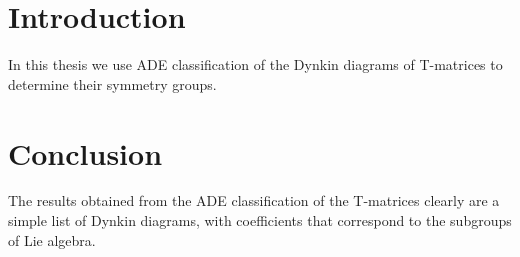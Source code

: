 \documentclass{article}
\begin{document}
\section{Introduction}

In this thesis we use ADE classification of the Dynkin diagrams of T-matrices
to determine their symmetry groups.

\section{Conclusion}

The results obtained from the ADE classification of the T-matrices clearly are
a simple list of Dynkin diagrams, with coefficients that correspond to the
subgroups of Lie algebra.
\end{document}
